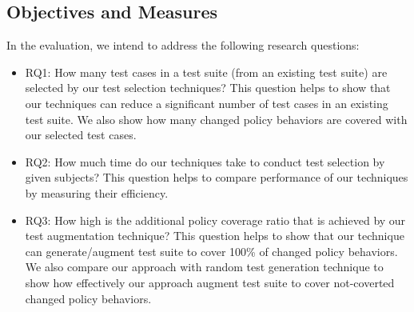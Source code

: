 \subsection{Objectives and Measures}
In the evaluation, we intend to address the following research questions:
\begin{itemize}


	\item RQ1: How many test cases in a test suite (from an existing test suite) are selected by our test selection techniques? This question helps to show that our techniques can reduce a significant number of test cases in an existing test suite.
	We also show how many changed policy behaviors are covered with our selected test cases.
	
	
	\item RQ2: How much time do our techniques take to conduct test selection by given subjects? This question helps to compare performance of our techniques by measuring their efficiency.
			
	\item RQ3: How high is the additional policy coverage ratio that is achieved by our test augmentation technique?  This question helps to show that our technique can generate/augment test suite to cover 100\% of changed policy behaviors. We also compare our approach with random test generation technique to show how effectively our approach augment test suite to cover not-coverted changed policy behaviors.
				
\end{itemize}

%




